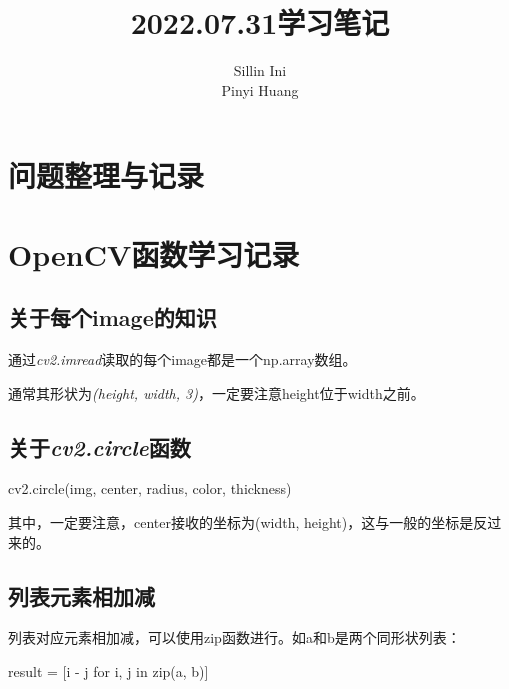 \documentclass[AutoFakeBold]{MyFormat}
\begin{document}
%
%


\title{{2022.07.31学习笔记}}
\author{Sillin Ini\\Pinyi Huang}
\maketitle
\thispagestyle{empty}
\newpage

\tableofcontents
\thispagestyle{empty}
\newpage

\mainmatter




\setcounter{chapter}{0}
\chapter{问题整理与记录}


\chapter{OpenCV函数学习记录}
\section{关于每个image的知识}
\par 通过\textit{cv2.imread}读取的每个image都是一个np.array数组。
\par 通常其形状为\textit{(height, width, 3)}，一定要注意height位于width之前。


\section{关于\textit{cv2.circle}函数}
\par cv2.circle(img, center, radius, color, thickness)
\par 其中，一定要注意，center接收的坐标为(width, height)，这与一般的坐标是反过来的。

\section{列表元素相加减}
\par 列表对应元素相加减，可以使用zip函数进行。如a和b是两个同形状列表：
\par result = [i - j for i, j in zip(a, b)]
\end{document}
